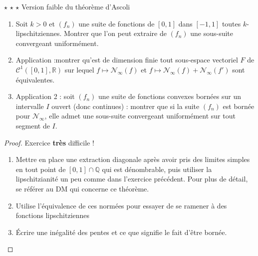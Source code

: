 \documentclass[french,a4paper]{article}
\newcommand{\Q}{\mathbb{Q}}
\newcommand{\R}{\mathbb{R}}
\theoremstyle{plain}
\theoremstyle{definition}
\theoremstyle{remark}
\begin{document}
\begin{ex}{$\star$ $\star$ $\star$ Version faible du théorème d'Ascoli}
	\begin{enumerate}
		\item Soit $k>0$ et $(f_n)$ une suite de fonctions de $[0,1]$ dans $[-1,1]$ toutes $k$-lipschitziennes. Montrer que l'on peut extraire de $(f_n)$ une sous-suite convergeant uniformément.
		\item Application :montrer qu'est de dimension finie tout sous-espace vectoriel $F$ de $\mathcal{C}^1([0,1],\R)$ sur lequel $f\mapsto\mathcal{N}_\infty(f)$ et $f\mapsto\mathcal{N}_\infty(f)+\mathcal{N}_\infty(f')$ sont équivalentes.
		\item Application 2 : soit $(f_n)$ une suite de fonctions convexes bornées sur un intervalle $I$ ouvert (donc continues) : montrer que si la suite $(f_n)$ est bornée pour $\mathcal{N}_\infty$, elle admet une sous-suite convergeant uniformément sur tout segment de $I$.
	\end{enumerate}
\end{ex}
\begin{proof}
	Exercice \textbf{très} difficile !
	\begin{enumerate}
		\item Mettre en place une extraction diagonale après avoir pris des limites simples en tout point de $[0,1]\cap \Q$ qui est dénombrable, puis utiliser la lipschitzianité un peu comme dans l'exercice précédent. Pour plus de détail, se référer au DM qui concerne ce théorème.
		\item Utilise l'équivalence de ces normées pour essayer de se ramener à des fonctions lipschitziennes
		\item Écrire une inégalité des pentes et ce que signifie le fait d'être bornée.
	\end{enumerate}
\end{proof}
\end{document}
